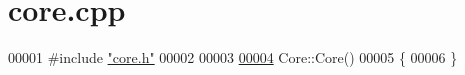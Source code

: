 \hypertarget{a00011_source}{}\section{core.\+cpp}
\label{a00011_source}

\begin{DoxyCode}
00001 \textcolor{preprocessor}{#}\textcolor{preprocessor}{include} \hyperlink{a00014}{"core.h"}
00002 
00003 
\hyperlink{a00145_a14e63188e0aa7c4a6f72d5501384d1f9}{00004} Core::Core()
00005 \{
00006 \}
\end{DoxyCode}
